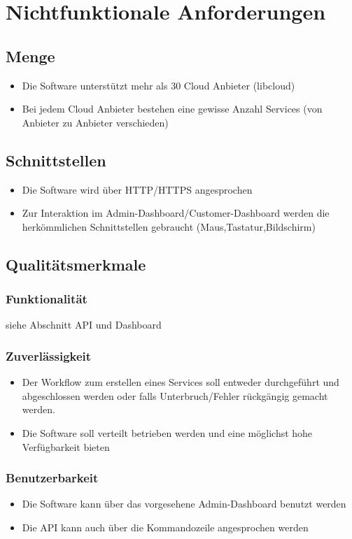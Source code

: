 \documentclass[11pt]{scrartcl}
\begin{document}
\section{Nichtfunktionale Anforderungen}
\subsection{Menge}
\begin{itemize}
  \item Die Software unterstützt mehr als 30 Cloud Anbieter (libcloud)
  \item Bei jedem Cloud Anbieter bestehen eine gewisse Anzahl Services (von Anbieter zu Anbieter verschieden)
\end{itemize}

\subsection{Schnittstellen}
\begin{itemize}
  \item Die Software wird über HTTP/HTTPS angesprochen
  \item Zur Interaktion im Admin-Dashboard/Customer-Dashboard werden die herkömmlichen 
  Schnittstellen gebraucht (Maus,Tastatur,Bildschirm)
\end{itemize}
\subsection{Qualitätsmerkmale}
\subsubsection{Funktionalität}
siehe Abschnitt API und Dashboard
\subsubsection{Zuverlässigkeit}
\begin{itemize}
  \item Der Workflow zum erstellen eines Services soll entweder durchgeführt und 
  abgeschlossen werden oder falls Unterbruch/Fehler rückgängig gemacht 
  werden.
  \item Die Software soll verteilt betrieben werden und eine möglichst hohe 
  Verfügbarkeit bieten
\end{itemize}
\subsubsection{Benutzerbarkeit}
\begin{itemize}
  \item Die Software kann über das vorgesehene Admin-Dashboard benutzt werden
  \item Die API kann auch über die Kommandozeile angesprochen werden
\end{itemize}
\end{document}
